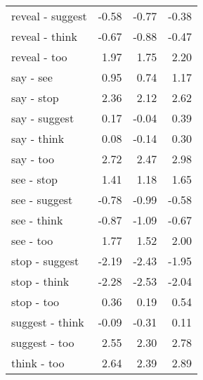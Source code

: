 \begin{longtable}{lrrr}
  reveal - suggest & -0.58 & -0.77 & -0.38 \\ 
  reveal - think & -0.67 & -0.88 & -0.47 \\ 
  reveal - too & 1.97 & 1.75 & 2.20 \\ 
  say - see & 0.95 & 0.74 & 1.17 \\ 
  say - stop & 2.36 & 2.12 & 2.62 \\ 
  say - suggest & 0.17 & -0.04 & 0.39 \\ 
  say - think & 0.08 & -0.14 & 0.30 \\ 
  say - too & 2.72 & 2.47 & 2.98 \\ 
  see - stop & 1.41 & 1.18 & 1.65 \\ 
  see - suggest & -0.78 & -0.99 & -0.58 \\ 
  see - think & -0.87 & -1.09 & -0.67 \\ 
  see - too & 1.77 & 1.52 & 2.00 \\ 
  stop - suggest & -2.19 & -2.43 & -1.95 \\ 
  stop - think & -2.28 & -2.53 & -2.04 \\ 
  stop - too & 0.36 & 0.19 & 0.54 \\ 
  suggest - think & -0.09 & -0.31 & 0.11 \\ 
  suggest - too & 2.55 & 2.30 & 2.78 \\ 
  think - too & 2.64 & 2.39 & 2.89 \\ 
  \end{longtable}

